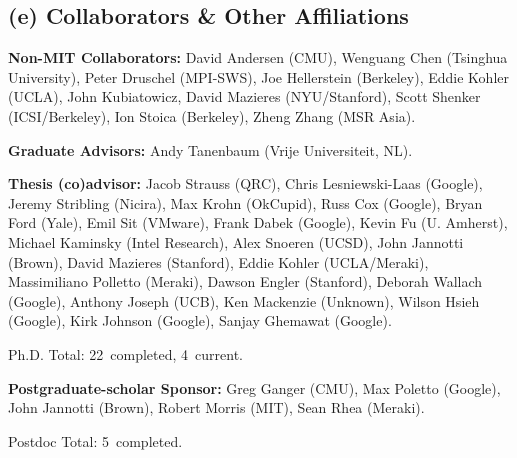 \documentclass{article}
\begin{document}
\subsection*{(e) Collaborators \& Other Affiliations}
\noindent\textbf{Non-MIT Collaborators:}  David Andersen (CMU),
Wenguang Chen (Tsinghua University), Peter Druschel (MPI-SWS), Joe
Hellerstein (Berkeley), Eddie Kohler (UCLA), John Kubiatowicz, David
Mazieres (NYU/Stanford), Scott Shenker (ICSI/Berkeley), Ion Stoica
(Berkeley), Zheng Zhang (MSR Asia).

\vspace{0.1in}

\noindent\textbf{Graduate Advisors:} Andy Tanenbaum (Vrije
Universiteit, NL).

\vspace{0.1in}

\noindent\textbf{Thesis (co)advisor:}
Jacob Strauss (QRC), Chris Lesniewski-Laas (Google), Jeremy Stribling (Nicira),
Max Krohn (OkCupid), Russ Cox (Google), Bryan Ford (Yale), Emil Sit (VMware),
Frank Dabek (Google), Kevin Fu (U. Amherst), Michael Kaminsky (Intel Research),
Alex Snoeren (UCSD), John Jannotti (Brown), David Mazieres (Stanford), Eddie
Kohler (UCLA/Meraki), Massimiliano Polletto (Meraki), Dawson Engler (Stanford),
Deborah Wallach (Google), Anthony Joseph (UCB), Ken Mackenzie (Unknown), Wilson
Hsieh (Google), Kirk Johnson (Google), Sanjay Ghemawat (Google).

Ph.D. Total: 22~completed, 4~current.

\vspace{0.1in}

\noindent\textbf{Postgraduate-scholar Sponsor:} Greg Ganger (CMU), Max
Poletto (Google), John Jannotti (Brown), Robert Morris (MIT), Sean
Rhea (Meraki).

Postdoc Total: 5~completed.
\end{document}
